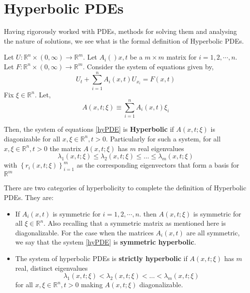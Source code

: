 \documentclass[11pt, a4paper]{report}
\begin{document}
\section{Hyperbolic PDEs}
Having rigorously worked with PDEs, methods for solving them and analysing the nature of solutions, we see what is 
the formal definition of Hyperbolic PDEs. 

Let $U:\mathbb{R}^{n}\times(0, \infty)\rightarrow\mathbb{R}^{m}$. Let $A_i()x, t$ be a $m\times m$ matrix for $i = 1,
2, \cdots, n$. Let $F:\mathbb{R}^{n}\times(0, \infty)\rightarrow\mathbb{R}^{m}$. Consider the system of equations given
by,
\begin{equation} \label{hyPDE}
    U_{t} + \sum_{i = 1}^{n}A_{i}(x, t)U_{x_{i}} = F(x, t)
\end{equation}
Fix $\xi \in \mathbb{R}^{n}$. Let,
\begin{equation*}
    A(x, t; \xi)\equiv\sum_{i = 1}^{n}A_{i}(x, t)\xi_{i}
\end{equation*} 

Then, the system of equations \eqref{hyPDE} is {\bfseries Hyperbolic} if $A(x, t; \xi)$ is diagonizable for all $x,
\xi \in \mathbb{R}^{n}, t>0$. Particularly for such a system, for all $x,\xi \in \mathbb{R}^{n}, t>0$ the matrix $A(x,
 t; \xi)$ has $m$ real eigenvalues
 \begin{equation*}
    \lambda_{1}(x, t; \xi) \leq \lambda_{2}(x, t; \xi) \leq \ldots \leq \lambda_{m}(x, t;\xi)
 \end{equation*}
with $\left\{r_{i}(x, t; \xi )\right\}_{i = 1}^{m}$ as the corresponding eigenvectors that form a basis for $\mathbb{R}
^{m}$

There are two categories of hyperbolicity to complete the definition of Hyperbolic PDEs. They are:
\begin{itemize}
    \item If $A_{i}(x,t)$ is symmetric for $i = 1, 2, \cdots, n$. then $A(x, t; \xi)$ is symmetric for all $\xi \in 
    \mathbb{R}^{n}$. Also recalling that a symmetric matrix as mentioned here is diagonalizable. For the case when
    the matrices $A_{i}(x, t)$ are all symmetric, we say that the system \eqref{hyPDE} is {\bfseries symmetric 
    hyperbolic}.

    \item The system of hyperbolic PDEs is {\bfseries strictly hyperbolic} if $A(x,t;\xi)$ has $m$ real, distinct 
    eigenvalues
        \begin{equation*}
            \lambda_{1}(x, t; \xi) < \lambda_{2}(x, t; \xi) < \ldots < \lambda_{m}(x, t;\xi)
        \end{equation*}
    for all $x,\xi \in \mathbb{R}^{n}, t>0$ making $A(x, t; \xi)$ diagonalizable.
\end{itemize}
\end{document}
